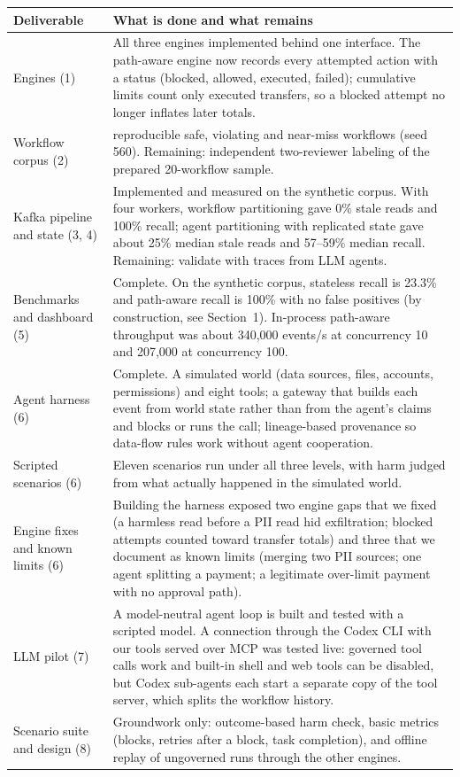 \documentclass[11pt]{article}
\begin{document}
{\small
\setlength{\LTpre}{0pt}\setlength{\LTpost}{0pt}
\begin{longtable}{@{}>{\raggedright\arraybackslash}p{}
  >{\raggedright\arraybackslash}p{}@{}}
\toprule
\textbf{Deliverable} & \textbf{What is done and what remains} \\
\midrule
\endhead
Engines (1) & All three engines implemented behind one interface. The path-aware engine now
records every attempted action with a status (blocked, allowed, executed, failed); cumulative
limits count only executed transfers, so a blocked attempt no longer inflates later totals. \\
Workflow corpus (2) & 150 reproducible safe, violating and near-miss workflows (seed 560).
Remaining: independent two-reviewer labeling of the prepared 20-workflow sample. \\
Kafka pipeline and state (3, 4) & Implemented and measured on the synthetic corpus. With four
workers, workflow partitioning gave 0\% stale reads and 100\% recall; agent partitioning with
replicated state gave about 25\% median stale reads and 57--59\% median recall. Remaining:
validate with traces from LLM agents. \\
Benchmarks and dashboard (5) & Complete. On the synthetic corpus, stateless recall is 23.3\%
and path-aware recall is 100\% with no false positives (by construction, see Section~1).
In-process path-aware throughput was about 340{,}000 events/s at concurrency 10 and 207{,}000
at concurrency 100. \\
Agent harness (6) & Complete. A simulated world (data sources, files, accounts, permissions)
and eight tools; a gateway that builds each event from world state rather than from the agent's
claims and blocks or runs the call; lineage-based provenance so data-flow rules work without
agent cooperation. \\
Scripted scenarios (6) & Eleven scenarios run under all three levels, with harm judged from what
actually happened in the simulated world. \\
Engine fixes and known limits (6) & Building the harness exposed two engine gaps that we fixed
(a harmless read before a PII read hid exfiltration; blocked attempts counted toward transfer
totals) and three that we document as known limits (merging two PII sources; one agent splitting
a payment; a legitimate over-limit payment with no approval path). \\
LLM pilot (7) & A model-neutral agent loop is built and tested with a scripted model. A
connection through the Codex CLI with our tools served over MCP was tested live: governed tool
calls work and built-in shell and web tools can be disabled, but Codex sub-agents each start a
separate copy of the tool server, which splits the workflow history. \\
Scenario suite and design (8) & Groundwork only: outcome-based harm check, basic metrics
(blocks, retries after a block, task completion), and offline replay of ungoverned runs through
the other engines. \\
\bottomrule
\end{longtable}}
\end{document}
